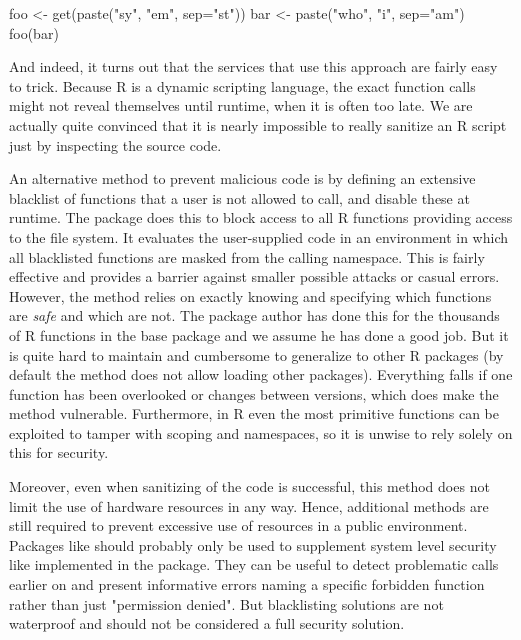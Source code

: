 \documentclass{jss}
\newcommand{\R}{\textsf{R}\xspace}
\newcommand{\RAppArmor}{\pkg{RAppArmor}\xspace}
\begin{document}
\begin{CodeChunk}
\begin{CodeInput}
foo <- get(paste("sy", "em", sep="st"))
bar <- paste("who", "i", sep="am")
foo(bar)
\end{CodeInput}
\end{CodeChunk}

And indeed, it turns out that the services that use this approach are fairly
easy to trick. Because \R is a dynamic scripting language, the exact function
calls might not reveal themselves until runtime, when it is often too late. We
are actually quite convinced that it is nearly impossible to really sanitize an
\R script just by inspecting the source code.

An alternative method to prevent malicious code is by defining an extensive
blacklist of functions that a user is not allowed to call, and disable these at
runtime. The  package \citep{sandboxR}  does this to block access
to all \R functions providing access to the file system. It evaluates the
user-supplied code in an environment in which all blacklisted functions are
masked from the calling namespace. This is fairly effective and provides a
barrier against smaller possible attacks or casual errors. However, the method
relies on exactly knowing and specifying which functions are \emph{safe} and
which are not. The package author has done this for the thousands of \R
functions in the base package and we assume he has done a good job. But it is
quite hard to maintain and cumbersome to generalize to other \R packages (by
default the method does not allow loading other packages). Everything falls if
one function has been overlooked or changes between versions, which does make
the method vulnerable. Furthermore, in \R even the most primitive functions can
be exploited to tamper with scoping and namespaces, so it is unwise to rely
solely on this for security.

Moreover, even when sanitizing of the code is successful, this method does not
limit the use of hardware resources in any way. Hence, additional methods are
still required to prevent excessive use of resources in a public environment.
Packages like  should probably only be used to supplement system
level security like implemented in the \RAppArmor package. They can be useful to
detect problematic calls earlier on and present informative errors naming a
specific forbidden function rather than just "permission denied". But
blacklisting solutions are not waterproof and should not be considered a full
security solution.
\end{document}

